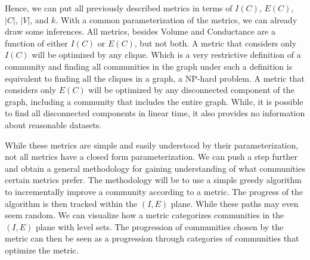 \documentclass[phd,tocprelim]{cornell}
\begin{document}
Hence, we can put all previously described metrics in terms of $I(C)$, $E(C)$, $|C|$, $|V|$, and $k$.  With a common parameterization of the metrics, we can already draw some inferences.  All metrics, besides {\sc Volume} and {\sc Conductance} are a function of either $I(C)$ or $E(C)$, but not both.  A metric that considers only $I(C)$ will be optimized by any clique.  Which is a very restrictive definition of a community and finding all communities in the graph under such a definition is equivalent to finding all the cliques in a graph, a NP-hard problem.  A metric that considers only $E(C)$ will be optimized by any disconnected component of the graph, including a community that includes the entire graph.  While, it is possible to find all disconnected components in linear time, it also provides no information about reasonable datasets.

While these metrics are simple and easily understood by their parameterization, not all metrics have a closed form parameterization.  We can push a step further and obtain a general methodology for gaining understanding of what communities certain metrics prefer.  The methodology will be to use a simple greedy algorithm to incrementally improve a community according to a metric.  The progress of the algorithm is then tracked within the $(I, E)$ plane.  While these paths may even seem random.  We can visualize how a metric categorizes communities in the $(I, E)$ plane with level sets.  The progression of communities chosen by the metric can then be seen as a progression through categories of communities that optimize the metric.
\end{document}

